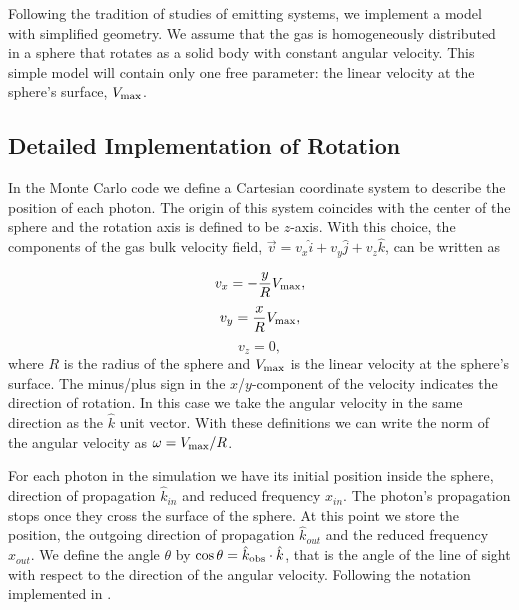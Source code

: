 \documentclass{emulateapj}
\newcommand{\ly}{{\ifmmode{{\rm Ly}\alpha~}\else{Ly$\alpha$~}\fi}}
\begin{document}
Following the tradition of studies of \ly emitting systems,
we implement a model with simplified geometry. We assume that the gas
is homogeneously distributed in a sphere that rotates as a solid body
with constant angular velocity. This simple model will contain only
one free parameter: the linear velocity at the sphere's surface, $V_{\rm
  max}$. 

\subsection{Detailed Implementation of Rotation}

 In the Monte Carlo code we define a Cartesian coordinate system to
 describe the position of each photon. The origin of this system
 coincides with the center of the sphere and the rotation axis is defined
 to be $z$-axis. With this choice, the components of the gas bulk velocity
 field, $\vec{v} = v_{x}\hat{i} + v_{y}\hat{j} + v_{z}\hat{k}$, can be
 written as  
  
\begin{equation}
    v_{x}=-\frac{y}{R}V_{\rm max}, \label{subeq1}
\end{equation}
\begin{equation}
    v_{y}=\frac{x}{R}V_{\rm max}, \label{subeq2}
\end{equation}
\begin{equation}
    v_{z}=0, \label{subeq3}
\end{equation}
%
where $R$ is the radius of the sphere and $V_{\rm max}$ is the linear
velocity at the sphere's surface. The minus/plus sign in the
$x$/$y$-component of the velocity indicates the direction of
rotation. In this case we take the angular velocity in the same
direction as the $\hat{k}$ unit vector. With these definitions we can
write the norm of the angular velocity as $\omega=V_{\rm max}/R$.  

For each photon in the simulation we have its initial position inside
the sphere, direction of propagation $\hat{k}_{in}$ and reduced
frequency $x_{in}$. The photon's propagation stops once they cross the
surface of the sphere. At this point we store the position, the outgoing direction
of propagation $\hat{k}_{out}$ and the reduced frequency $x_{out}$. We
define the angle $\theta$ by $\cos\theta = \hat{k}_{\rm obs}\cdot
\hat{k}$, that is the angle of the line of sight with
respect to the direction of the angular velocity. Following the notation
implemented in \cite{Zheng2013}. %
\end{document}
